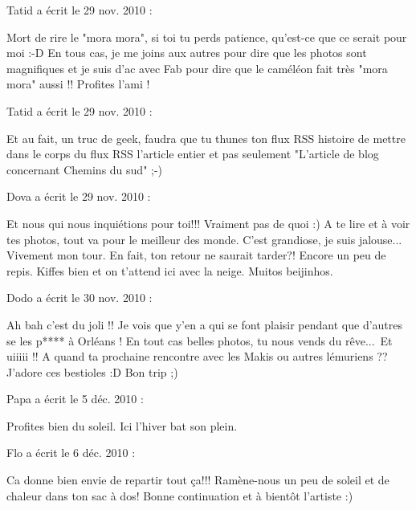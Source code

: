 \medskip
Tatid a écrit le 29 nov. 2010 :
\begin{displayquote}
Mort de rire le "mora mora", si toi tu perds patience, qu'est-ce que ce serait pour moi :-D
En tous cas, je me joins aux autres pour dire que les photos sont magnifiques et je suis d'ac avec Fab pour dire que le caméléon fait très "mora mora" aussi !!
Profites l'ami !
\end{displayquote}

\medskip
Tatid a écrit le 29 nov. 2010 :
\begin{displayquote}
Et au fait, un truc de geek, faudra que tu thunes ton flux RSS histoire de mettre dans le corps du flux RSS l'article entier et pas seulement "L'article de blog concernant Chemins du sud" ;-)
\end{displayquote}

\medskip
Dova a écrit le 29 nov. 2010 :
\begin{displayquote}
Et nous qui nous inquiétions pour toi!!!
Vraiment pas de quoi :)
A te lire et à voir tes photos, tout va pour le meilleur des monde.
C'est grandiose, je suis jalouse... Vivement mon tour.
En fait, ton retour ne saurait tarder?! Encore un peu de repis. Kiffes bien et on t'attend ici avec la neige.
Muitos beijinhos.
\end{displayquote}

\medskip
Dodo a écrit le 30 nov. 2010 :
\begin{displayquote}
Ah bah c'est du joli !! Je vois que y'en a qui se font plaisir pendant que d'autres se les p**** à Orléans !
En tout cas belles photos, tu nous vends du rêve... Et uiiiii !! A quand ta prochaine rencontre avec les Makis ou autres lémuriens ?? J'adore ces bestioles :D
Bon trip ;)
\end{displayquote}

\medskip
Papa a écrit le 5 déc. 2010 :
\begin{displayquote}
Profites bien du soleil. Ici l'hiver bat son plein.
\end{displayquote}

\medskip
Flo a écrit le 6 déc. 2010 :
\begin{displayquote}
Ca donne bien envie de repartir tout ça!!!
Ramène-nous un peu de soleil et de chaleur dans ton sac à dos!
Bonne continuation et à bientôt l'artiste :)
\end{displayquote}

\vfill

